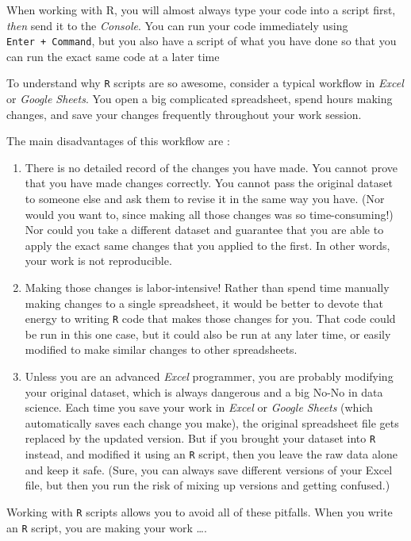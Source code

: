 \documentclass[
]{book}
\begin{document}
When working with R, you will almost always type your code into a script first, \emph{then} send it to the \emph{Console}. You can run your code immediately using \texttt{Enter\ +\ Command}, but you also have a script of what you have done so that you can run the exact same code at a later time

To understand why \texttt{R} scripts are so awesome, consider a typical workflow in \emph{Excel} or \emph{Google Sheets}. You open a big complicated spreadsheet, spend hours making changes, and save your changes frequently throughout your work session.

The main disadvantages of this workflow are :

\begin{enumerate}
\def\labelenumi{\arabic{enumi}.}
\item
  There is no detailed record of the changes you have made. You cannot prove that you have made changes correctly. You cannot pass the original dataset to someone else and ask them to revise it in the same way you have. (Nor would you want to, since making all those changes was so time-consuming!) Nor could you take a different dataset and guarantee that you are able to apply the exact same changes that you applied to the first. In other words, your work is not reproducible.
\item
  Making those changes is labor-intensive! Rather than spend time manually making changes to a single spreadsheet, it would be better to devote that energy to writing \texttt{R} code that makes those changes for you. That code could be run in this one case, but it could also be run at any later time, or easily modified to make similar changes to other spreadsheets.
\item
  Unless you are an advanced \emph{Excel} programmer, you are probably modifying your original dataset, which is always dangerous and a big No-No in data science. Each time you save your work in \emph{Excel} or \emph{Google Sheets} (which automatically saves each change you make), the original spreadsheet file gets replaced by the updated version. But if you brought your dataset into \texttt{R} instead, and modified it using an \texttt{R} script, then you leave the raw data alone and keep it safe. (Sure, you can always save different versions of your Excel file, but then you run the risk of mixing up versions and getting confused.)
\end{enumerate}

Working with \texttt{R} scripts allows you to avoid all of these pitfalls. When you write an \texttt{R} script, you are making your work \ldots.
\end{document}
